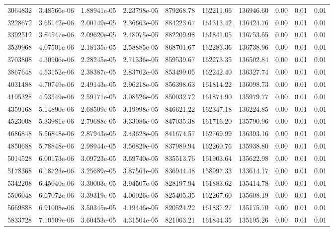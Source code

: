 \begin{table*}[htbp]
\begin{tabular}{r r r r r r r r r r}
3064832 & 3.48566e-06 & 1.88941e-05 & 2.23798e-05 & 879268.78 & 162211.06 & 136946.60 & 0.00 & 0.01 & 0.01 \\
3228672 & 3.65142e-06 & 2.00149e-05 & 2.36663e-05 & 884223.67 & 161313.42 & 136424.76 & 0.00 & 0.01 & 0.01 \\
3392512 & 3.84547e-06 & 2.09620e-05 & 2.48075e-05 & 882209.98 & 161841.05 & 136753.65 & 0.00 & 0.01 & 0.01 \\
3539968 & 4.07501e-06 & 2.18135e-05 & 2.58885e-05 & 868701.67 & 162283.36 & 136738.96 & 0.00 & 0.01 & 0.01 \\
3703808 & 4.30906e-06 & 2.28245e-05 & 2.71336e-05 & 859539.67 & 162273.35 & 136502.84 & 0.00 & 0.01 & 0.01 \\
3867648 & 4.53152e-06 & 2.38387e-05 & 2.83702e-05 & 853499.05 & 162242.40 & 136327.74 & 0.00 & 0.01 & 0.01 \\
4031488 & 4.70749e-06 & 2.49143e-05 & 2.96218e-05 & 856398.63 & 161814.22 & 136098.73 & 0.00 & 0.01 & 0.01 \\
4195328 & 4.93549e-06 & 2.59171e-05 & 3.08526e-05 & 850032.72 & 161874.90 & 135979.77 & 0.00 & 0.01 & 0.01 \\
4359168 & 5.14890e-06 & 2.68509e-05 & 3.19998e-05 & 846621.22 & 162347.18 & 136224.85 & 0.00 & 0.01 & 0.01 \\
4523008 & 5.33981e-06 & 2.79688e-05 & 3.33086e-05 & 847035.38 & 161716.20 & 135790.96 & 0.00 & 0.01 & 0.01 \\
4686848 & 5.56848e-06 & 2.87943e-05 & 3.43628e-05 & 841674.57 & 162769.99 & 136393.16 & 0.00 & 0.01 & 0.01 \\
4850688 & 5.78848e-06 & 2.98944e-05 & 3.56829e-05 & 837989.94 & 162260.76 & 135938.80 & 0.00 & 0.01 & 0.01 \\
5014528 & 6.00173e-06 & 3.09723e-05 & 3.69740e-05 & 835513.76 & 161903.64 & 135622.98 & 0.00 & 0.01 & 0.01 \\
5178368 & 6.18723e-06 & 3.25689e-05 & 3.87561e-05 & 836944.48 & 158997.33 & 133614.17 & 0.00 & 0.01 & 0.01 \\
5342208 & 6.45040e-06 & 3.30003e-05 & 3.94507e-05 & 828197.94 & 161883.62 & 135414.78 & 0.00 & 0.01 & 0.01 \\
5506048 & 6.67072e-06 & 3.39319e-05 & 4.06026e-05 & 825405.35 & 162267.60 & 135608.19 & 0.00 & 0.01 & 0.01 \\
5669888 & 6.91008e-06 & 3.50345e-05 & 4.19446e-05 & 820524.22 & 161837.27 & 135175.70 & 0.00 & 0.01 & 0.01 \\
5833728 & 7.10509e-06 & 3.60453e-05 & 4.31504e-05 & 821063.21 & 161844.35 & 135195.26 & 0.00 & 0.01 & 0.01 \\

\end{tabular}
\end{table*}
